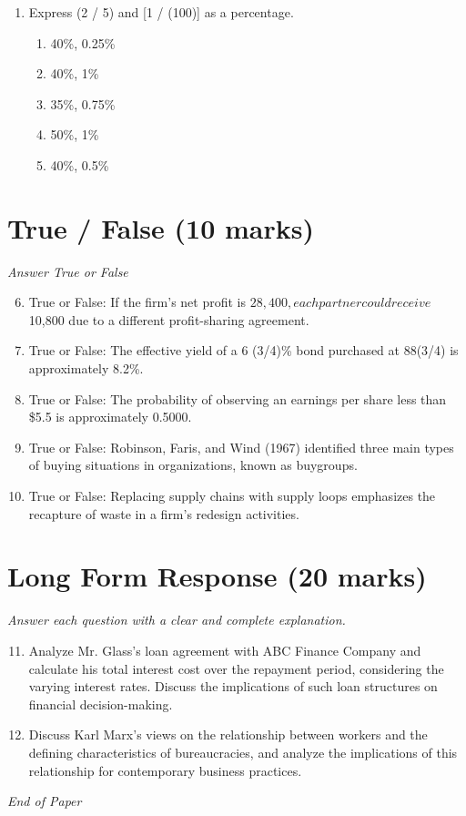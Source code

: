 \documentclass[12pt]{article}
\begin{document}
\begin{enumerate}[label=\arabic*.]
\begin{enumerate}[label=(\alph*)]
    \item \$6.00
    \item \$1.50
    \item \$5.00
    \item \$4.00
    \item \$0.20
\end{enumerate}
\item Express (2 / 5) and [1 / (100)] as a percentage.
\begin{enumerate}[label=(\alph*)]
    \item 40\%, 0.25\%
    \item 40\%, 1\%
    \item 35\%, 0.75\%
    \item 50\%, 1\%
    \item 40\%, 0.5\%
\end{enumerate}
\end{enumerate}

\section*{True / False (10 marks)}
\textit{Answer True or False}
\begin{enumerate}[label=\arabic*.]
\setcounter{enumi}{5}
\item True or False: If the firm's net profit is $28,400, each partner could receive $10,800 due to a different profit-sharing agreement.
\item True or False: The effective yield of a 6 (3/4)\% bond purchased at 88(3/4) is approximately 8.2\%.
\item True or False: The probability of observing an earnings per share less than \$5.5 is approximately 0.5000.
\item True or False: Robinson, Faris, and Wind (1967) identified three main types of buying situations in organizations, known as buygroups.
\item True or False: Replacing supply chains with supply loops emphasizes the recapture of waste in a firm's redesign activities.
\end{enumerate}

\section*{Long Form Response (20 marks)}
\textit{Answer each question with a clear and complete explanation.}
\begin{enumerate}[label=\arabic*.]
\setcounter{enumi}{10}
\item Analyze Mr. Glass's loan agreement with ABC Finance Company and calculate his total interest cost over the repayment period, considering the varying interest rates. Discuss the implications of such loan structures on financial decision-making.
\item Discuss Karl Marx's views on the relationship between workers and the defining characteristics of bureaucracies, and analyze the implications of this relationship for contemporary business practices.
\end{enumerate}

\vfill
\noindent\textit{End of Paper}
\end{document}
